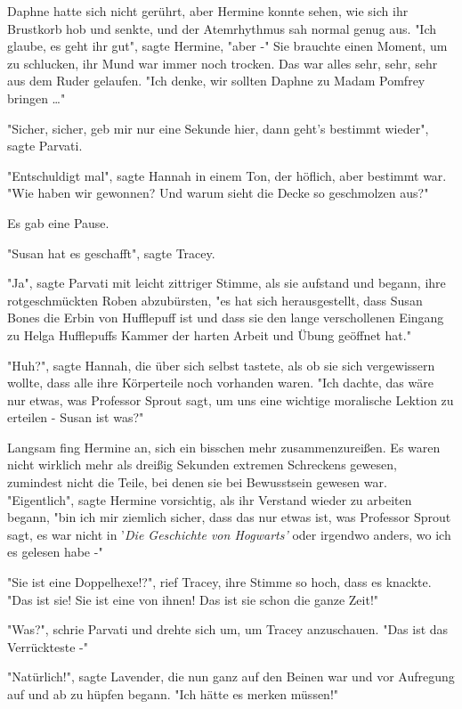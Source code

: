 {Daphne hatte sich nicht gerührt, aber Hermine konnte sehen, wie sich ihr Brustkorb hob und senkte, und der Atemrhythmus sah normal genug aus. "Ich glaube, es geht ihr gut", sagte Hermine, "aber -" Sie brauchte einen Moment, um zu schlucken, ihr Mund war immer noch trocken. Das war alles sehr, sehr, sehr aus dem Ruder gelaufen. "Ich denke, wir sollten Daphne zu Madam Pomfrey bringen …"

"Sicher, sicher, geb mir nur eine Sekunde hier, dann geht's bestimmt wieder", sagte Parvati.

"Entschuldigt mal", sagte Hannah in einem Ton, der höflich, aber bestimmt war. "Wie haben wir gewonnen? Und warum sieht die Decke so geschmolzen aus?"

Es gab eine Pause.

"Susan hat es geschafft", sagte Tracey.

"Ja", sagte Parvati mit leicht zittriger Stimme, als sie aufstand und begann, ihre rotgeschmückten Roben abzubürsten, "es hat sich herausgestellt, dass Susan Bones die Erbin von Hufflepuff ist und dass sie den lange verschollenen Eingang zu Helga Hufflepuffs Kammer der harten Arbeit und Übung geöffnet hat."

"Huh?", sagte Hannah, die über sich selbst tastete, als ob sie sich vergewissern wollte, dass alle ihre Körperteile noch vorhanden waren. "Ich dachte, das wäre nur etwas, was Professor Sprout sagt, um uns eine wichtige moralische Lektion zu erteilen - Susan ist was?"

Langsam fing Hermine an, sich ein bisschen mehr zusammenzureißen. Es waren nicht wirklich mehr als dreißig Sekunden extremen Schreckens gewesen, zumindest nicht die Teile, bei denen sie bei Bewusstsein gewesen war.\\ "Eigentlich", sagte Hermine vorsichtig, als ihr Verstand wieder zu arbeiten begann, "bin ich mir ziemlich sicher, dass das nur etwas ist, was Professor Sprout sagt, es war nicht in '\emph{Die Geschichte von Hogwarts'} oder irgendwo anders, wo ich es gelesen habe -"

"Sie ist eine Doppelhexe!?", rief Tracey, ihre Stimme so hoch, dass es knackte. "Das ist sie! Sie ist eine von ihnen! Das ist sie schon die ganze Zeit!"

"Was?", schrie Parvati und drehte sich um, um Tracey anzuschauen. "Das ist das Verrückteste -"

"Natürlich!", sagte Lavender, die nun ganz auf den Beinen war und vor Aufregung auf und ab zu hüpfen begann. "Ich hätte es merken müssen!"

}
